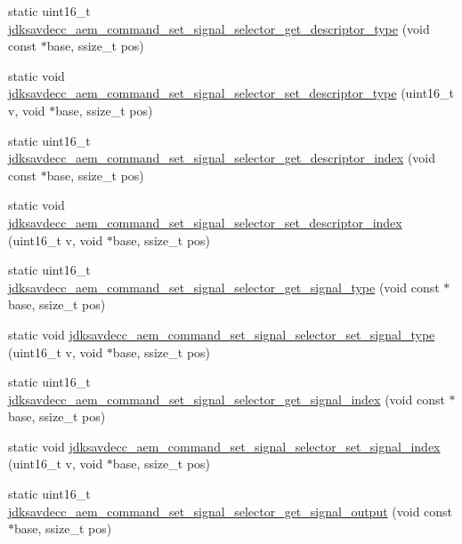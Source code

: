 \begin{DoxyCompactItemize}
\item 
static uint16\+\_\+t \hyperlink{group__command__set__signal__selector_gaee2e81eb3c23ba7973dec680bc8dba95}{jdksavdecc\+\_\+aem\+\_\+command\+\_\+set\+\_\+signal\+\_\+selector\+\_\+get\+\_\+descriptor\+\_\+type} (void const $\ast$base, ssize\+\_\+t pos)
\item 
static void \hyperlink{group__command__set__signal__selector_ga88810c2d439e98cc401b492f9e4badd6}{jdksavdecc\+\_\+aem\+\_\+command\+\_\+set\+\_\+signal\+\_\+selector\+\_\+set\+\_\+descriptor\+\_\+type} (uint16\+\_\+t v, void $\ast$base, ssize\+\_\+t pos)
\item 
static uint16\+\_\+t \hyperlink{group__command__set__signal__selector_ga8c762e3079314d1001b8193c41049501}{jdksavdecc\+\_\+aem\+\_\+command\+\_\+set\+\_\+signal\+\_\+selector\+\_\+get\+\_\+descriptor\+\_\+index} (void const $\ast$base, ssize\+\_\+t pos)
\item 
static void \hyperlink{group__command__set__signal__selector_ga90ddd0b7b5e6229265253f07498c30dd}{jdksavdecc\+\_\+aem\+\_\+command\+\_\+set\+\_\+signal\+\_\+selector\+\_\+set\+\_\+descriptor\+\_\+index} (uint16\+\_\+t v, void $\ast$base, ssize\+\_\+t pos)
\item 
static uint16\+\_\+t \hyperlink{group__command__set__signal__selector_gad6a29b738378811722b84ffbaf332d28}{jdksavdecc\+\_\+aem\+\_\+command\+\_\+set\+\_\+signal\+\_\+selector\+\_\+get\+\_\+signal\+\_\+type} (void const $\ast$base, ssize\+\_\+t pos)
\item 
static void \hyperlink{group__command__set__signal__selector_gab5f9576f538aace59f8adea60bac9771}{jdksavdecc\+\_\+aem\+\_\+command\+\_\+set\+\_\+signal\+\_\+selector\+\_\+set\+\_\+signal\+\_\+type} (uint16\+\_\+t v, void $\ast$base, ssize\+\_\+t pos)
\item 
static uint16\+\_\+t \hyperlink{group__command__set__signal__selector_gad129f712cf56b197817fc8db6afeeabe}{jdksavdecc\+\_\+aem\+\_\+command\+\_\+set\+\_\+signal\+\_\+selector\+\_\+get\+\_\+signal\+\_\+index} (void const $\ast$base, ssize\+\_\+t pos)
\item 
static void \hyperlink{group__command__set__signal__selector_ga46271aad016ed06685d033cf29419680}{jdksavdecc\+\_\+aem\+\_\+command\+\_\+set\+\_\+signal\+\_\+selector\+\_\+set\+\_\+signal\+\_\+index} (uint16\+\_\+t v, void $\ast$base, ssize\+\_\+t pos)
\item 
static uint16\+\_\+t \hyperlink{group__command__set__signal__selector_ga24e3ce61ff4f56c8feb2f7a31d378542}{jdksavdecc\+\_\+aem\+\_\+command\+\_\+set\+\_\+signal\+\_\+selector\+\_\+get\+\_\+signal\+\_\+output} (void const $\ast$base, ssize\+\_\+t pos)

\end{DoxyCompactItemize}
